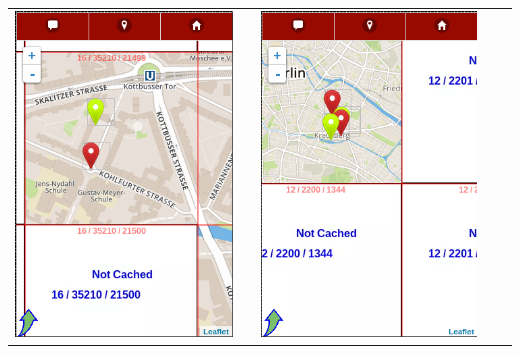 	\begin{table}[H]
  		\begin{adjustwidth}{-0.3cm}{0.3cm}
		\centering
		\begin{tabulary}{\columnwidth}{C >{\centering}m{1cm} C >{\centering}m{1cm} C}
			\includegraphics[scale=0.5]{bilder/screenshots/offline_16.png} & & \includegraphics[scale=0.5]{bilder/screenshots/offline_12.png} & & \in
\end{tabulary}
\end{adjustwidth}
\end{table}
